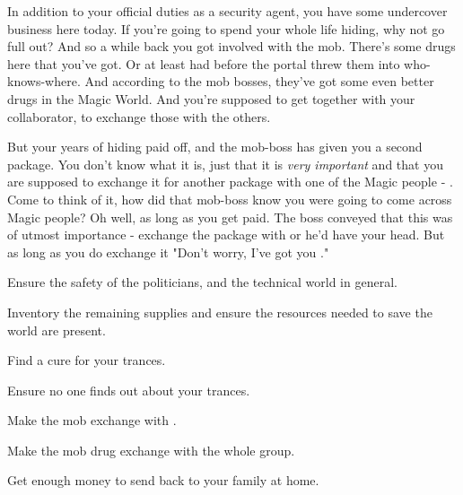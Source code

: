 \documentclass[char]{guildcamp3}
\begin{document}
In addition to your official duties as a security agent, you have some undercover business here today. If you're going to spend your whole life hiding, why not go full out? And so a while back you got involved with the mob. There's some drugs here that you've got. Or at least had before the portal threw them into who-knows-where. And according to the mob bosses, they've got some even better drugs in the Magic World. And you're supposed to get together with your collaborator, \cPoliTwo{\informal} to exchange those with the others. 

But your years of hiding paid off, and the mob-boss has given you a second package. You don't know what it is, just that it is \emph{very important} and that you are supposed to exchange it for another package with one of the Magic people - \cServant{\intro}. Come to think of it, how did that mob-boss know you were going to come across Magic people? Oh well, as long as you get paid. The boss conveyed that this was of utmost importance - exchange the package with \cServant{} or he'd have your head. But as long as you do exchange it "Don't worry, I've got you \cSpecOpTwo{\informal}." 


\begin{itemz}[Goals]
  \item Ensure the safety of the politicians, and the technical world in general.
  \item Inventory the remaining supplies and ensure the resources needed to save the world are present.
  \item Find a cure for your trances.
  \item Ensure no one finds out about your trances.
  \item Make the mob exchange with \cServant{\informal}.
  \item Make the mob drug exchange with the whole group.
  \item Get enough money to send back to your family at home. 
\end{itemz}
\end{document}
